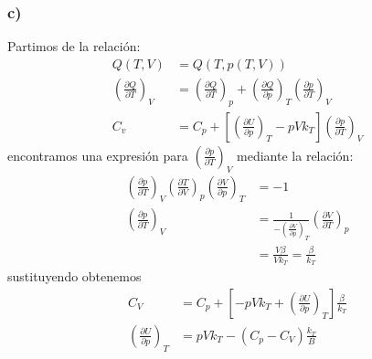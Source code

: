 \documentclass{article}
\begin{document}
\begin{tcolorbox}[breakable]
    \subsubsection*{c)}
    Partimos de la relación:
    \begin{align*}
        Q(T,V) &= Q(T,p(T,V)) \\
        \left( \frac{\partial Q}{\partial T} \right)_V 
        &= \left(\frac{\partial Q}{\partial T}\right)_p + \left(\frac{\partial Q}{\partial p}\right)_T \left( \frac{\partial p}{\partial T} \right)_V  \\
        C_v 
        &= C_p + \left[ \left( \frac{\partial U}{\partial p} \right)_T -pVk_T \right] \left( \frac{\partial p}{\partial T} \right)_V 
    \end{align*}
    encontramos una expresión para $\left( \frac{\partial p}{\partial T} \right)_V$ mediante la relación:
    \begin{align*}
        \left( \frac{\partial p}{\partial T} \right)_V 
        \left( \frac{\partial T}{\partial V} \right)_p 
        \left( \frac{\partial V}{\partial p} \right)_T
        &= -1 \\
        \left( \frac{\partial p}{\partial T} \right)_V 
        &= \frac{1}{-\left(\frac{\partial V}{\partial p} \right)_T}\left( \frac{\partial V}{\partial T} \right)_p \\
        &= \frac{V\beta}{Vk_T} = \frac{\beta}{k_T} 
    \end{align*}
    sustituyendo obtenemos
    \begin{align*}
        C_V &= C_p + \left[ -pVk_T + \left(\frac{\partial U}{\partial p}\right)_T  \right] \frac{\beta}{k_T} \\
        \left(\frac{\partial U}{\partial p}\right)_T &= pVk_T - (C_p-C_V)\frac{k_T}{B}
    \end{align*}

\end{tcolorbox}
\end{document}
